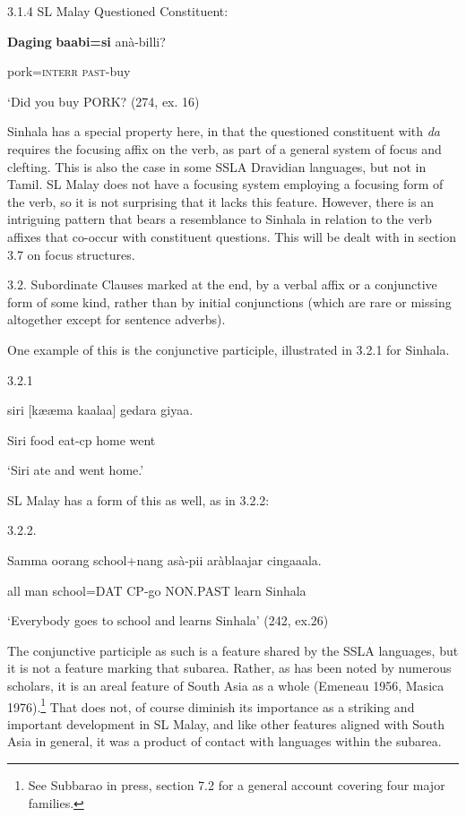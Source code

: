 \documentclass[letterpaper]{article}
\begin{document}
 3.1.4 SL Malay Questioned Constituent:


\ea
\gll \textbf{Daging} \textbf{baabi=si} anà-billi?

  pork=\textsc{interr}  \textsc{past}-buy

  `Did you buy PORK?  (274, ex. 16)

 Sinhala has a special property here, in that the questioned constituent with \textit{da} requires the focusing affix on the verb, as part of a general system of focus and clefting. This is also the case in some SSLA Dravidian languages, but not in Tamil. SL Malay does not have a focusing system  employing a focusing form of the verb, so it is not surprising that it lacks this feature. However, there is an intriguing pattern that bears a resemblance to Sinhala in relation to the verb affixes that co-occur with constituent questions. This will be dealt with in section 3.7 on focus structures.

3.2. Subordinate Clauses marked at the end, by a verbal affix or a conjunctive form of some kind, rather than by initial conjunctions (which are rare or missing altogether except for sentence adverbs). 

 One example of this is the conjunctive participle, illustrated in 3.2.1 for Sinhala. 

3.2.1 

\ea
\gll siri [k{\ae}{\ae}ma kaalaa] gedara giyaa.

Siri  food eat-cp home  went

 `Siri ate and went home.'

SL Malay has a form of this as well, as in 3.2.2:

 3.2.2.

\ea
\gll Samma oorang school+nang asà-pii arà{\textdiv}blaajar cingaaala.

 all man school=DAT CP-go NON.PAST {\textdiv}learn Sinhala

 `Everybody goes to school and learns Sinhala'  (242, ex.26)

The conjunctive participle as such is a feature shared by the SSLA languages, but it is not a feature marking that subarea. Rather, as has been noted by numerous scholars, it is an areal feature of South Asia as a whole (Emeneau 1956, Masica 1976).\footnote{See
  Subbarao in press, section 7.2 for a general account covering four major families.
} 
That does not, of course diminish its importance as a striking and important development in SL Malay, and like other features aligned with South Asia in general, it was a product of contact with languages within the subarea. 
\end{document}
